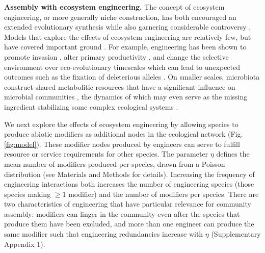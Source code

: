 \documentclass[twocolumn,preprintnumbers,amsmath,amssymb,superscriptaddress,linenumbers]{revtex4-1}
\begin{document}
\vspace{0mm}
\noindent \textbf{Assembly with ecosystem engineering.}
The concept of ecosystem engineering, or more generally niche construction, has both encouraged an extended evolutionary synthesis \cite{Laland2015} while also garnering considerable controversy \cite{Gupta2017,Feldman2017}.
Models that explore the effects of ecosystem engineering are relatively few, but have covered important ground \cite{Hastings2007,OdlingSmee2013}.
For example, engineering has been shown to promote invasion \cite{Cuddington2004}, alter primary productivity \cite{Wright2004}, and change the selective environment over eco-evolutionary timescales \cite{Kylafis2008,Krakauer2009} which can lead to unexpected outcomes such as the fixation of deleterious alleles \cite{Laland1999}.
On smaller scales, microbiota construct shared metabolitic resources that have a significant influence on microbial communities \cite{Kallus2017}, the dynamics of which may even serve as the missing ingredient stabilizing some complex ecological systems \cite{Muscarella2017}.


We next explore the effects of ecosystem engineering by allowing species to produce abiotic modifiers as additional nodes in the ecological network (Fig. \ref{fig:model}).
These modifier nodes produced by engineers can serve to fulfill resource or service requirements for other species.
The parameter $\eta$ defines the mean number of modifiers produced per species, drawn from a Poisson distribution (see Materials and Methods for details).
Increasing the frequency of engineering interactions both increases the number of engineering species (those species making $\geq 1$ modifier) and the number of modifiers per species.
There are two characteristics of engineering that have particular relevance for community assembly:
modifiers can linger in the community even after the species that produce them have been excluded, and
more than one engineer can produce the same modifier such that engineering redundancies increase with $\eta$ (Supplementary Appendix 1).
\end{document}
